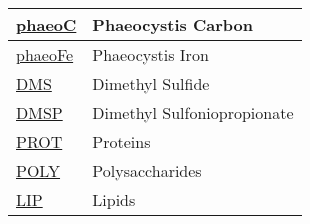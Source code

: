 {\begin{center}
\begin{longtable}{| p{2.0in} | p{4.0in} |}
    \hline
    \hyperref[subsec:var_sec_state_phaeoC]{phaeoC} & Phaeocystis Carbon \\
    \hline
    \hyperref[subsec:var_sec_state_phaeoFe]{phaeoFe} & Phaeocystis Iron \\
    \hline
    \hyperref[subsec:var_sec_state_DMS]{DMS} & Dimethyl Sulfide \\
    \hline
    \hyperref[subsec:var_sec_state_DMSP]{DMSP} & Dimethyl Sulfoniopropionate \\
    \hline
    \hyperref[subsec:var_sec_state_PROT]{PROT} & Proteins \\
    \hline
    \hyperref[subsec:var_sec_state_POLY]{POLY} & Polysaccharides \\
    \hline
    \hyperref[subsec:var_sec_state_LIP]{LIP} & Lipids \\
    \hline
\end{longtable}
\end{center}
}
